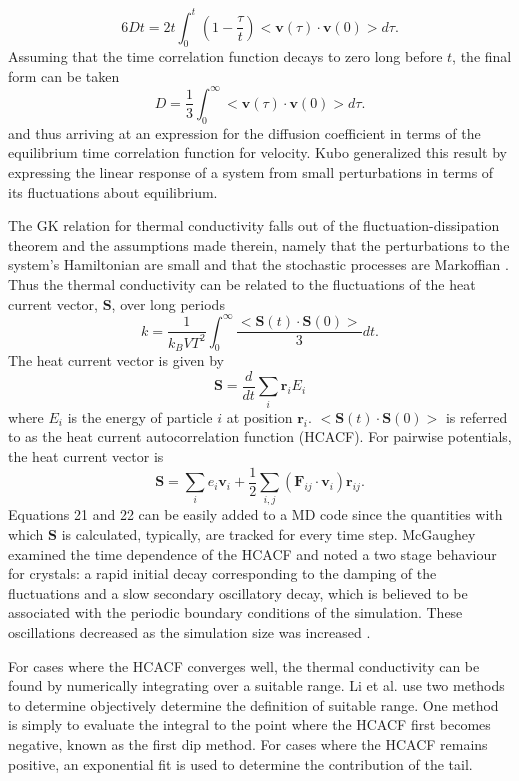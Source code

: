%
\begin{equation}
6Dt=2t\int_0^t\left(1-\frac{\tau}{t}\right)<\bm{v}(\tau)\cdot\bm{v}(0)>d\tau.
\end{equation}
%
Assuming that the time correlation function decays to zero long before $t$, the final form can be taken
%
\begin{equation}
D=\frac{1}{3}\int_0^{\infty}<\bm{v}(\tau)\cdot\bm{v}(0)>d\tau.
\end{equation}
%
and thus arriving at an expression for the diffusion coefficient in terms of the equilibrium time correlation function for velocity. Kubo generalized this result by expressing the linear response of a system from small perturbations in terms of its fluctuations about equilibrium.

The GK relation for thermal conductivity falls out of the fluctuation-dissipation theorem and the assumptions made therein, namely that the perturbations to the system's Hamiltonian are small and that the stochastic processes are Markoffian \cite{green:398}. Thus the thermal conductivity can be related to the fluctuations of the heat current vector, $\bm{S}$, over long periods
%
\begin{equation}
k=\frac{1}{k_B V T^2}\int_0^{\infty}\frac{<\bm{S}(t)\cdot\bm{S}(0)>}{3}dt.
\end{equation}
%
The heat current vector is given by 
%
\begin{equation}
\bm{S}=\frac{d}{dt}\sum_i\bm{r}_iE_i
\end{equation}
%
where $E_i$ is the energy of particle $i$ at position $\bm{r}_i$. $<\bm{S}(t)\cdot\bm{S}(0)>$ is referred to as the heat current autocorrelation function (HCACF). For pairwise potentials, the heat current vector is
%
\begin{equation}
\bm{S}=\sum_ie_i\bm{v}_i+\frac{1}{2}\sum_{i,j}(\bm{F}_{ij}\cdot\bm{v}_{i})\bm{r}_{ij}.
\end{equation}
%
Equations 21 and 22 can be easily added to a MD code since the quantities with which $\bm{S}$ is calculated, typically, are tracked for every time step. McGaughey examined the time dependence of the HCACF and noted a two stage behaviour for crystals: a rapid initial decay corresponding to the damping of the fluctuations and a slow secondary oscillatory decay, which is believed to be associated with the periodic boundary conditions of the simulation. These oscillations decreased as the simulation size was increased \cite{mcgaugheythesis}.

For cases where the HCACF converges well, the thermal conductivity can be found by numerically integrating over a suitable range. Li et al. \cite{Li1998139} use two methods to determine objectively determine the definition of suitable range. One method is simply to evaluate the integral to the point where the HCACF first becomes negative, known as the first dip method. For cases where the HCACF remains positive, an exponential fit is used to determine the contribution of the tail.


